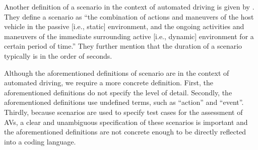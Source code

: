 Another definition of a scenario in the context of automated driving is given by \textcite{elrofai2016scenario}. They define a scenario as ``the combination of actions and maneuvers of the host vehicle in the passive [i.e., static] environment, and the ongoing activities and maneuvers of the immediate surrounding active [i.e., dynamic] environment for a certain period of time.'' They further mention that the duration of a scenario typically is in the order of seconds.


Although the aforementioned definitions of scenario \autocite{geyer2014, ulbrich2015, elrofai2016scenario} are in the context of automated driving, we require a more concrete definition. First, the aforementioned definitions do not specify the level of detail. 
Secondly, the aforementioned definitions use undefined terms, such as ``action'' and ``event''. Thirdly, because scenarios are used to specify test cases for the assessment of AVs, a clear and unambiguous specification of these scenarios is important and the aforementioned definitions are not concrete enough to be directly reflected into a coding language.



